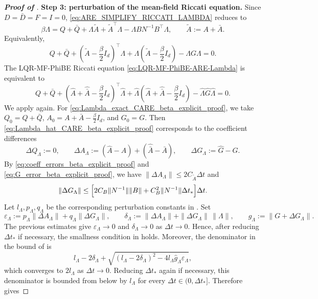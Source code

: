 \documentclass[a4paper, 10pt, english, reqno]{amsart}
\begin{document}
\begin{proof}[\textbf{Proof of }]
\medskip
\noindent
\textbf{Step 3: perturbation of the mean-field Riccati equation.}
Since $D=\bar D=F=I=0$, \eqref{eq:ARE_SIMPLIFY_RICCATI_LAMBDA} reduces to
\[
  \beta\Lambda
  =
  Q+\bar Q
  +
  \Lambda\tilde A+\tilde A^\top\Lambda
  -
  \Lambda BN^{-1}B^\top\Lambda,
  \qquad
  \tilde A:=A+\bar A.
\]
Equivalently,
\begin{equation}
\label{eq:Lambda_exact_CARE_beta_explicit_proof}
  Q+\bar Q
  +
  \left(\tilde A-\frac{\beta}{2}I_d\right)^\top\Lambda
  +
  \Lambda\left(\tilde A-\frac{\beta}{2}I_d\right)
  -
  \Lambda G\Lambda
  =
  0.
\end{equation}
The LQR-MF-PhiBE Riccati equation \eqref{eq:LQR-MF-PhiBE-ARE-Lambda} is equivalent to
\begin{equation}
\label{eq:Lambda_hat_CARE_beta_explicit_proof}
  Q+\bar Q
  +
  \left(\hat A+\hat{\bar A}-\frac{\beta}{2}I_d\right)^\top
  \hat\Lambda
  +
  \hat\Lambda
  \left(\hat A+\hat{\bar A}-\frac{\beta}{2}I_d\right)
  -
  \hat\Lambda\hat G\hat\Lambda
  =
  0.
\end{equation}
We apply \cite[Theorem~3.1]{Sun1998} again. For \eqref{eq:Lambda_exact_CARE_beta_explicit_proof}, we take $Q_0=Q+\bar Q$, $A_0=A+\bar A-\frac{\beta}{2}I_d$, and $G_0=G$. Then \eqref{eq:Lambda_hat_CARE_beta_explicit_proof} corresponds to the coefficient differences
\[
\Delta Q_\Lambda:=0,
\qquad
\Delta A_\Lambda:=(\hat A-A)+(\hat{\bar A}-\bar A),
\qquad
\Delta G_\Lambda:=\hat G-G.
\]
By \eqref{eq:coeff_errors_beta_explicit_proof} and \eqref{eq:G_error_beta_explicit_proof}, we have $\|\Delta A_\Lambda\|\le 2C_{\tilde A}\Delta t$ and
\[
  \|\Delta G_\Lambda\|
  \le
  \Bigl[
    2C_B\|N^{-1}\|\|B\|
    +
    C_B^2\|N^{-1}\|\Delta t_*
  \Bigr]\Delta t.
\]
Let $l_\Lambda,p_\Lambda,q_\Lambda$ be the corresponding perturbation constants in \cite[Theorem~3.1]{Sun1998}. Set
\[
\varepsilon_\Lambda:=p_\Lambda\|\Delta A_\Lambda\|+q_\Lambda\|\Delta G_\Lambda\|,
\qquad
\delta_\Lambda:=\|\Delta A_\Lambda\|+\|\Delta G_\Lambda\|\,\|\Lambda\|,
\qquad
\hat g_\Lambda:=\|G+\Delta G_\Lambda\|.
\]
The previous estimates give $\varepsilon_\Lambda\to0$ and $\delta_\Lambda\to0$ as $\Delta t\to0$. Hence, after reducing $\Delta t_*$ if necessary, the smallness condition in \cite[Theorem~3.1]{Sun1998} holds. Moreover, the denominator in the bound of \cite[Theorem~3.1]{Sun1998} is
\[
l_\Lambda-2\delta_\Lambda+
\sqrt{(l_\Lambda-2\delta_\Lambda)^2-4l_\Lambda\hat g_\Lambda\varepsilon_\Lambda},
\]
which converges to $2l_\Lambda$ as $\Delta t\to0$. Reducing $\Delta t_*$ again if necessary, this denominator is bounded from below by $l_\Lambda$ for every $\Delta t\in(0,\Delta t_*]$. Therefore \cite[Theorem~3.1]{Sun1998} gives

\end{proof}
\end{document}
